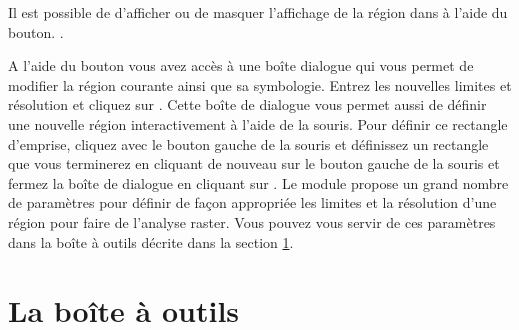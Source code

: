 {%
Il est possible de d'afficher ou de masquer l'affichage de la région \grass dans \qg à l'aide du bouton. .

A l'aide du bouton  vous avez accès à une boîte dialogue qui vous permet de modifier la région courante ainsi que sa symbologie. Entrez les nouvelles limites et résolution et cliquez sur . Cette boîte de dialogue vous permet aussi de définir une nouvelle région interactivement à l'aide de la souris. Pour définir ce rectangle d'emprise, cliquez avec le bouton gauche de la souris et définissez un rectangle que vous terminerez en cliquant de nouveau sur le bouton gauche de la souris et fermez la boîte de dialogue en cliquant sur . Le module \grass {} propose un grand nombre de paramètres pour définir de façon appropriée les limites et la résolution d'une région pour faire de l'analyse raster. Vous pouvez vous servir de ces paramètres dans la boîte à outils \grass décrite dans la section \ref{subsec:grass_toolbox}.

\section{La boîte à outils \grass}\label{subsec:grass_toolbox}

}
